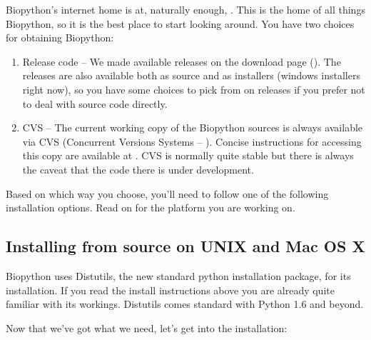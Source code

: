 \documentclass{article}
\begin{document}
Biopython's internet home is at, naturally enough,  
. This is the home of all things 
Biopython, so it is the best place to start looking around. 
You have two choices for obtaining Biopython:

\begin{enumerate}

\item Release code -- We made available releases on the download page 
(). 
The releases are also available both as source and as installers 
(windows installers right now), so you have some choices to pick from 
on releases if you prefer not to deal with source code directly.

\item CVS -- The current working copy of the Biopython sources is always
available via CVS (Concurrent Versions Systems --
). Concise instructions for
accessing this copy are available at
. CVS is normally quite stable
but there is always the caveat that the code there is under
development.

\end{enumerate}

Based on which way you choose, you'll need to follow one of the following installation options. Read on for the platform you are working on.

\subsection{Installing from source on UNIX and Mac OS X}
\label{sec:unix_install}

Biopython uses Distutils, the new standard python installation package, for
its installation. If you read the install instructions above you are
already quite familiar with its workings. Distutils comes standard with 
Python 1.6 and beyond.

Now that we've got what we need, let's get into the installation:
\end{document}
